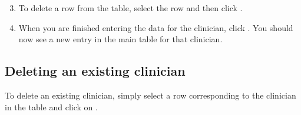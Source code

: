 \documentclass[letterpaper,10pt,english]{sphinxmanual}
\begin{document}
\begin{figure}[htbp]
\centering
{}\end{figure}

\begin{DUlineblock}{0em}
\item[] 
\end{DUlineblock}
\begin{enumerate}
\setcounter{enumi}{2}
\item {} 
To delete a row from the table, select the row and then click .

\end{enumerate}

\begin{figure}[htbp]
\centering
{}\end{figure}

\begin{DUlineblock}{0em}
\item[] 
\end{DUlineblock}
\begin{enumerate}
\setcounter{enumi}{3}
\item {} 
When you are finished entering the data for the clinician, click .
You should now see a new entry in the main table for that clinician.

\end{enumerate}

\begin{figure}[htbp]
\centering
{}\end{figure}

\begin{DUlineblock}{0em}
\item[] 
\end{DUlineblock}


\subsection{Deleting an existing clinician}
\label{\detokenize{index:deleting-an-existing-clinician}}
To delete an existing clinician, simply select a row corresponding
to the clinician in the table and click on .
\end{document}
